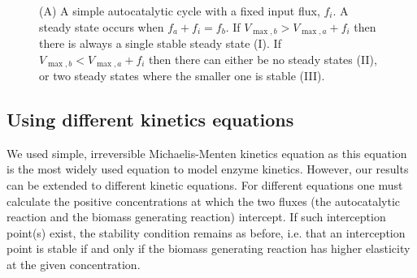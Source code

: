 \documentclass[a4page,notitlepage]{article}
\newcommand\influx{0.5}
\begin{document}
\begin{figure}[h!]
\begin{minipage}[c]{\linewidth}
{}
       \end{minipage}
      \caption{\label{fig:inputcycle}
        (A) A simple autocatalytic cycle with a fixed input flux, $f_i$.
        A steady state occurs when $f_a+f_i=f_b$.
        If $V_{\max,b}>V_{\max,a}+f_i$ then there is always a single stable steady state (I).
        If $V_{\max,b}<V_{\max,a}+f_i$ then there can either be no steady states (II), or two steady states where the smaller one is stable (III).
      }
    \end{figure}
    \subsection{Using different kinetics equations}
    We used simple, irreversible Michaelis-Menten kinetics equation as this equation is the most widely used equation to model enzyme kinetics.
    However, our results can be extended to different kinetic equations.
    For different equations one must calculate the positive concentrations at which the two fluxes (the autocatalytic reaction and the biomass generating reaction) intercept.
    If such interception point(s) exist, the stability condition remains as before, i.e. that an interception point is stable if and only if the biomass generating reaction has higher elasticity at the given concentration.
\end{document}
